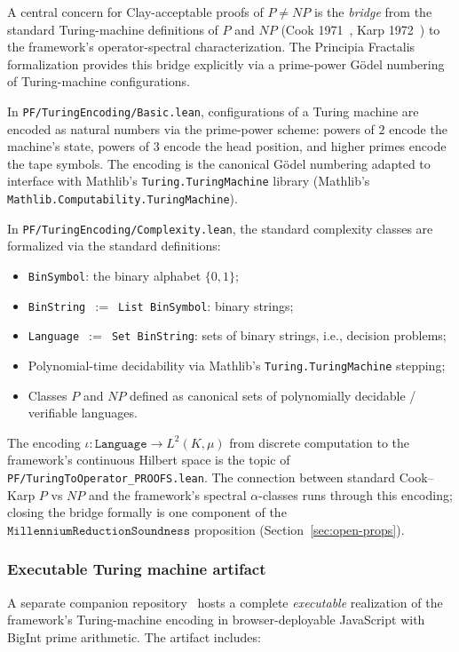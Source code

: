 \documentclass[11pt,a4paper]{article}
\theoremstyle{definition}
\theoremstyle{remark}
\begin{document}
A central concern for Clay-acceptable proofs of $P \neq NP$ is the
\emph{bridge} from the standard Turing-machine definitions of $P$ and
$NP$ (Cook 1971~\cite{cook1971complexity}, Karp
1972~\cite{karp1972reducibility}) to the framework's
operator-spectral characterization. The Principia Fractalis
formalization provides this bridge explicitly via a prime-power
G\"odel numbering of Turing-machine configurations.

In \texttt{PF/TuringEncoding/Basic.lean}, configurations of a Turing
machine are encoded as natural numbers via the prime-power scheme:
powers of $2$ encode the machine's state, powers of $3$ encode the
head position, and higher primes encode the tape symbols. The
encoding is the canonical G\"odel numbering adapted to interface with
Mathlib's \texttt{Turing.TuringMachine} library (Mathlib's
\texttt{Mathlib.Computability.TuringMachine}).

In \texttt{PF/TuringEncoding/Complexity.lean}, the standard complexity
classes are formalized via the standard definitions:
\begin{itemize}
\item \texttt{BinSymbol}: the binary alphabet $\{0, 1\}$;
\item \texttt{BinString $:=$ List BinSymbol}: binary strings;
\item \texttt{Language $:=$ Set BinString}: sets of binary strings,
i.e., decision problems;
\item Polynomial-time decidability via Mathlib's
\texttt{Turing.TuringMachine} stepping;
\item Classes $P$ and $NP$ defined as canonical sets of polynomially
decidable / verifiable languages.
\end{itemize}

The encoding $\iota\colon \mathtt{Language} \to L^2(K, \mu)$ from
discrete computation to the framework's continuous Hilbert space is
the topic of \texttt{PF/TuringToOperator\_PROOFS.lean}. The connection
between standard Cook--Karp $P$ vs $NP$ and the framework's spectral
$\alpha$-classes runs through this encoding; closing the bridge
formally is one component of the
$\mathtt{MillenniumReductionSoundness}$ proposition
(Section~\ref{sec:open-props}).

\subsubsection*{Executable Turing machine artifact}\label{subsubsec:turing-artifact}

A separate companion repository~\cite{cohen2026turing} hosts a complete
\emph{executable} realization of the framework's Turing-machine encoding
in browser-deployable JavaScript with BigInt prime arithmetic. The
artifact includes:
\end{document}
